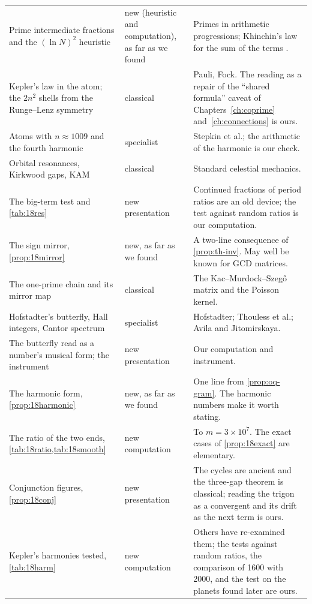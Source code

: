\begin{longtable}{p{}p{}p{}}
Prime intermediate fractions and the $(\ln N)^2$ heuristic \addedon{\revC} & new (heuristic and computation), as far as we found & Primes in arithmetic progressions; Khinchin's law for the sum of the terms \citep{Khinchin1964}. \\
Kepler's law in the atom; the $2n^{2}$ shells from the Runge--Lenz symmetry \addedon{\revD} & classical & Pauli, Fock. The reading as a repair of the ``shared formula'' caveat of Chapters~\ref{ch:coprime} and~\ref{ch:connections} is ours. \\
Atoms with $n\approx1009$ and the fourth harmonic \addedon{\revD} & specialist & Stepkin et al.; the arithmetic of the harmonic is our check. \\
Orbital resonances, Kirkwood gaps, KAM \addedon{\revD} & classical & Standard celestial mechanics. \\
The big-term test and \cref{tab:18res} \addedon{\revD} & new presentation & Continued fractions of period ratios are an old device; the test against random ratios is our computation. \\
The sign mirror, \cref{prop:18mirror} \addedon{\revD} & new, as far as we found & A two-line consequence of \cref{prop:th-inv}. May well be known for GCD matrices. \\
The one-prime chain and its mirror map \addedon{\revD} & classical & The Kac--Murdock--Szeg\H{o} matrix and the Poisson kernel. \\
Hofstadter's butterfly, Hall integers, Cantor spectrum \addedon{\revD} & specialist & Hofstadter; Thouless et al.; Avila and Jitomirskaya. \\
The butterfly read as a number's musical form; the instrument \addedon{\revD} & new presentation & Our computation and instrument. \\
The harmonic form, \cref{prop:18harmonic} \addedon{\revD} & new, as far as we found & One line from \cref{prop:oq-gram}. The harmonic numbers make it worth stating. \\
The ratio of the two ends, \cref{tab:18ratio,tab:18smooth} \addedon{\revD} & new computation & To $m=3\times10^{7}$. The exact cases of \cref{prop:18exact} are elementary. \\
Conjunction figures, \cref{prop:18conj} \addedon{\revD} & new presentation & The cycles are ancient and the three-gap theorem is classical; reading the trigon as a convergent and its drift as the next term is ours. \\
Kepler's harmonies tested, \cref{tab:18harm} \addedon{\revD} & new computation & Others have re-examined them; the tests against random ratios, the comparison of 1600 with 2000, and the test on the planets found later are ours. \\

\end{longtable}
